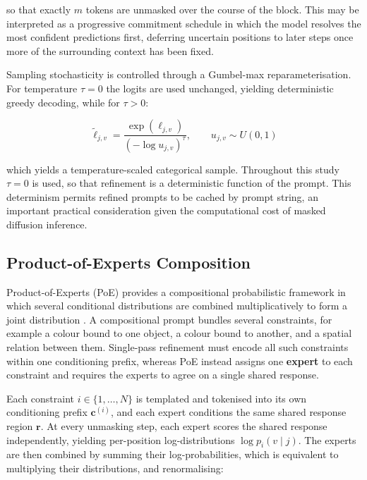 \documentclass[a4paper,twoside,12pt]{report}
\begin{document}
so that exactly \(m\) tokens are unmasked over the course of the block. This
may be interpreted as a progressive commitment schedule in which the model
resolves the most confident predictions first, deferring uncertain positions to
later steps once more of the surrounding context has been fixed.

Sampling stochasticity is controlled through a Gumbel-max reparameterisation. For
temperature \(\tau = 0\) the logits are used unchanged, yielding deterministic
greedy decoding, while for \(\tau > 0\):

\begin{equation}
\tilde{\ell}_{j,v}
= \frac{\exp(\ell_{j,v})}{(-\log u_{j,v})^{\tau}},
\qquad u_{j,v}\sim U(0,1)
\label{eq:gumbel}
\end{equation}

which yields a temperature-scaled categorical sample. Throughout this study
\(\tau = 0\) is used, so that refinement is a deterministic function of the
prompt. This determinism permits refined prompts to be cached by prompt string,
an important practical consideration given the computational cost of masked
diffusion inference.

\subsection{Product-of-Experts Composition}
\label{sec:poe}

Product-of-Experts (PoE) provides a compositional probabilistic framework in
which several conditional distributions are combined multiplicatively to form a
joint distribution \citep{hinton2002training, du2019implicit,
liu2022compositional}. A compositional prompt bundles several constraints, for
example a colour bound to one object, a colour bound to another, and a spatial
relation between them. Single-pass refinement must encode all such constraints
within one conditioning prefix, whereas PoE instead assigns one \textbf{expert}
to each constraint and requires the experts to agree on a single shared
response.

Each constraint \(i \in \{1,\dots,N\}\) is templated and tokenised into its own
conditioning prefix \(\mathbf{c}^{(i)}\), and each expert conditions the same
shared response region \(\mathbf{r}\). At every unmasking step, each expert
scores the shared response independently, yielding per-position
log-distributions \(\log p_i(v \mid j)\). The experts are then combined by
summing their log-probabilities, which is equivalent to multiplying their
distributions, and renormalising:
\end{document}
